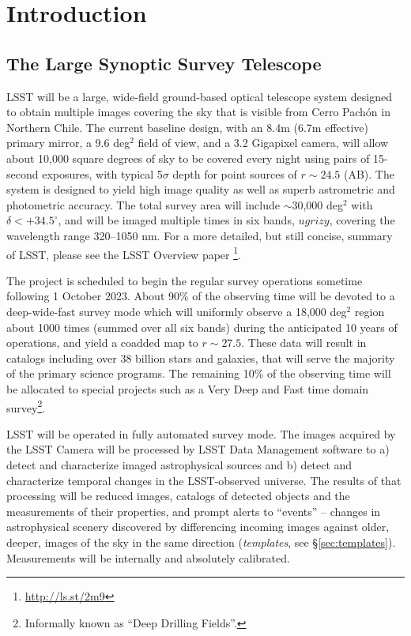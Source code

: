 \section{Introduction}

\subsection{The Large Synoptic Survey Telescope}

LSST will be a large, wide-field ground-based optical telescope system
designed to obtain multiple images covering the sky that is visible from Cerro Pach\'{o}n in Northern Chile. The current baseline design, with an 8.4m (6.7m effective) primary mirror, a 9.6 deg$^2$ field of view, and a 3.2 Gigapixel camera, will allow about 10,000 square degrees of sky to be covered every night using pairs of 15-second exposures, with typical 5$\sigma$ depth for point sources of $r\sim24.5$ (AB). The system is designed to yield high image quality as well as superb astrometric  and photometric accuracy. The total survey area will include $\sim$30,000 deg$^2$ with $\delta<+34.5^\circ$, and will be imaged multiple times in six bands, $ugrizy$, covering the wavelength range 320--1050 nm. For a more detailed, but still concise,
summary of LSST, please see the LSST Overview paper \citep{2008arXiv0805.2366I}\footnote{\url{http://ls.st/2m9}}.

The project is scheduled to begin the regular survey operations sometime following 1 October 2023. About 90\% of the observing time will be devoted to a deep-wide-fast survey mode which will uniformly observe a 18,000 deg$^2$ region about 1000 times (summed over all six bands) during the anticipated 10 years of operations, and yield a coadded map to $r\sim27.5$. These data will result in catalogs including over $38$ billion stars and galaxies, that will serve the majority of the primary science programs. The remaining 10\% of the observing time will be allocated to special projects such as a Very Deep and Fast time domain survey\footnote{Informally known as ``Deep Drilling Fields''.}.

LSST will be operated in fully automated survey mode. The images acquired by the LSST Camera will be processed by LSST Data Management software to a) detect and characterize imaged astrophysical sources and b) detect and characterize temporal changes in the LSST-observed universe. The results of that processing will be reduced images, catalogs of detected objects and the measurements of their properties, and prompt alerts to ``events'' -- changes in astrophysical scenery discovered by differencing incoming images against older, deeper, images of the sky in the same direction (\emph{templates}, see \S \ref{sec:templates}). Measurements will be internally and absolutely calibrated.

